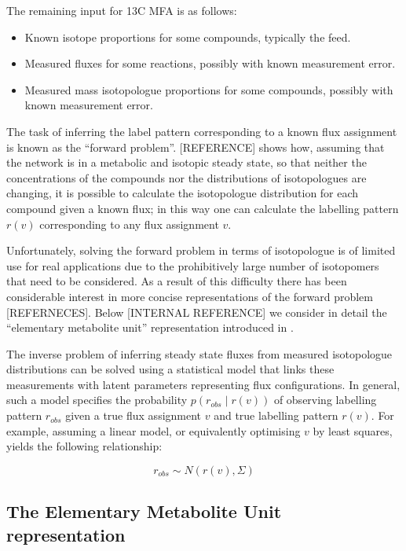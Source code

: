 \documentclass{article}
\begin{document}
The remaining input for 13C MFA is as follows:

\begin{itemize}
\item
  Known isotope proportions for some compounds, typically the feed.
\item
  Measured fluxes for some reactions, possibly with known measurement
  error.
\item
  Measured mass isotopologue proportions for some compounds, possibly
  with known measurement error.
\end{itemize}

The task of inferring the label pattern corresponding to a known flux
assignment is known as the ``forward problem''. {[}REFERENCE{]} shows
how, assuming that the network is in a metabolic and isotopic steady
state, so that neither the concentrations of the compounds nor the
distributions of isotopologues are changing, it is possible to calculate
the isotopologue distribution for each compound given a known flux; in
this way one can calculate the labelling pattern \(r(v)\) corresponding
to any flux assignment \(v\).

Unfortunately, solving the forward problem in terms of isotopologue is
of limited use for real applications due to the prohibitively large
number of isotopomers that need to be considered. As a result of this
difficulty there has been considerable interest in more concise
representations of the forward problem {[}REFERNECES{]}. Below
{[}INTERNAL REFERENCE{]} we consider in detail the ``elementary
metabolite unit'' representation introduced in
\citep{antoniewiczElementaryMetaboliteUnits2007}.

The inverse problem of inferring steady state fluxes from measured
isotopologue distributions can be solved using a statistical model that
links these measurements with latent parameters representing flux
configurations. In general, such a model specifies the probability
\(p(r_{obs}\mid r(v))\) of observing labelling pattern \(r_{obs}\) given
a true flux assignment \(v\) and true labelling pattern \(r(v)\). For
example, assuming a linear model, or equivalently optimising \(v\) by
least squares, yields the following relationship:

\[
r_{obs} \sim N(r(v), \Sigma)
\]

\subsection{The Elementary Metabolite Unit
representation}\label{the-elementary-metabolite-unit-representation}
\end{document}
